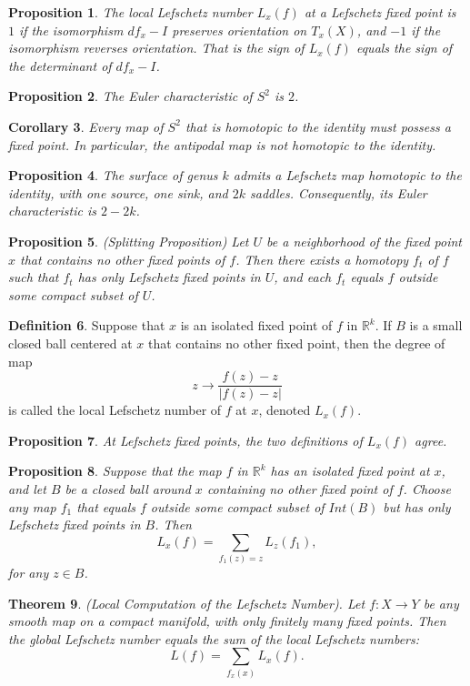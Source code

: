 \documentclass[psamsfonts]{amsart}
\newtheorem{theorem}{Theorem}[section]
\newtheorem{cor}[theorem]{Corollary}
\newtheorem{prop}[theorem]{Proposition}
\theoremstyle{definition}
\newtheorem{defn}[theorem]{Definition}
\theoremstyle{remark}
\numberwithin{equation}{section}
\begin{document}
		\begin{prop}
			The local Lefschetz number $L_x(f)$ at a Lefschetz fixed point is $1$ if the isomorphism $df_x-I$ preserves orientation on $T_x(X)$, and $-1$ if the isomorphism reverses orientation. That is the sign of $L_x(f)$ equals the sign of the determinant of $df_x - I$.
		\end{prop}
		\begin{prop}
			The Euler characteristic of $S^2$ is $2$.
		\end{prop}
		\begin{cor}
			Every map of $S^2$ that is homotopic to the identity must possess a fixed point. In particular, the antipodal map is not homotopic to the identity.
		\end{cor}
		\begin{prop}
			The surface of genus $k$ admits a Lefschetz map homotopic to the identity, with one source, one sink, and $2k$ saddles. Consequently, its Euler characteristic is $2-2k$.
		\end{prop}
		\begin{prop}(Splitting Proposition)
			Let $U$ be a neighborhood of the fixed point $x$ that contains no other fixed points of $f$. Then there exists a homotopy $f_t$ of $f$ such that $f_t$ has only Lefschetz fixed points in $U$, and each $f_t$ equals $f$ outside some compact subset of $U$.
		\end{prop}
		\begin{defn}
			Suppose that $x$ is an isolated fixed point of $f$ in $\mathbb{R}^k$. If $B$ is a small closed ball centered at $x$ that contains no other fixed point, then the degree of map
			\begin{equation}
				z \to \frac{f(z)-z}{|f(z)-z|}
			\end{equation}
			is called the local Lefschetz number of $f$ at $x$, denoted $L_x(f)$.
		\end{defn}
		\begin{prop}
			At Lefschetz fixed points, the two definitions of $L_x(f)$ agree.
		\end{prop}
		\begin{prop}
			Suppose that the map $f$ in $\mathbb{R}^k$ has an isolated fixed point at $x$, and let $B$ be a closed ball around $x$ containing no other fixed point of $f$. Choose any map $f_1$ that equals $f$ outside some compact subset of $Int(B)$ but has only Lefschetz fixed points in $B$. Then
			\begin{equation}
				L_x(f) = \sum_{f_1(z)=z}L_z(f_1),
			\end{equation}
			for any $z \in B$.
		\end{prop}
		\begin{theorem}(Local Computation of the Lefschetz Number).
			Let $f:X \to Y$ be any smooth map on a compact manifold, with only finitely many fixed points. Then the global Lefschetz number equals the sum of the local Lefschetz numbers:
			\begin{equation}
				L(f) = \sum_{f_x(x)}L_x(f).
			\end{equation}
			
		\end{theorem}
		
\end{document}
